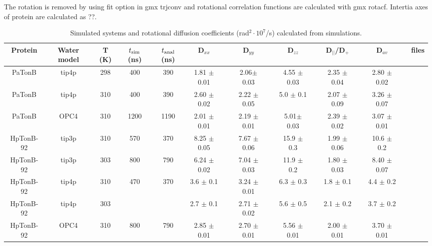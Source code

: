 \documentclass[pre,aps,floatfix,authordate1-4,twocolumn]{revtex4-1}
\begin{document}
The rotation is removed by using fit option in gmx trjconv and rotational
correlation functions are calculated with gmx rotacf. Intertia axes of protein
are calculated as ??.

\begin{table}[htb]
\centering
\caption{Simulated systems and rotational diffusion coefficients (rad$^2\cdot 10^7$/s) calculated from simulations.
}\label{ROTdiffCOEFFS}
\begin{tabular}{c c c c c c c c c c c c c c c c}
Protein     & Water model & T (K)  &  $t_{\rm sim}$ (ns)   &  $t_{\rm anal}$ (ns)   & D$_{xx}$ &&D$_{yy}$ &&D$_{zz}$ &&D$_{||}$/D$_+$ & &D$_{av}$& &files \\
\hline
PaTonB      & tip4p       & 298    & 400                 &  390                 & 1.81 $\pm$ 0.01 && 2.06$\pm$ 0.03 && 4.55 $\pm$ 0.03 && 2.35 $\pm$ 0.04 && 2.80 $\pm$ 0.02 && \cite{??} \\
PaTonB      & tip4p       & 310    & 400                 &  390                 &  2.60 $\pm$ 0.02 &&  2.22 $\pm$ 0.05& &  5.0  $\pm$ 0.1  & &  2.07 $\pm$ 0.09& &   3.26 $\pm$  0.07 && \cite{??}\\
PaTonB      & OPC4        & 310    & 1200                &  1190                &  2.01 $\pm$ 0.01 && 2.19 $\pm$ 0.01 && 5.01$\pm$ 0.03 && 2.39 $\pm$ 0.02 && 3.07 $\pm$ 0.01 && \cite{??}  \\
HpTonB-92   & tip3p       & 310    & 570           	 &  370                 & 8.25 $\pm$ 0.05 && 7.67 $\pm$ 0.06 && 15.9 $\pm$ 0.3 && 1.99 $\pm$ 0.06 &&  10.6 $\pm$ 0.2 &&  \cite{??} \\
HpTonB-92   & tip3p       & 303    & 800           	 &  790                 & 6.24 $\pm$ 0.02 && 7.04 $\pm$ 0.03 && 11.9 $\pm$ 0.2 && 1.80 $\pm$ 0.03 && 8.40 $\pm$ 0.07 && \cite{??} \\
HpTonB-92   & tip4p       & 310    & 470           	 &  370                 & 3.6 $\pm$ 0.1 && 3.24 $\pm$ 0.01 && 6.3 $\pm$ 0.3 && 1.8 $\pm$ 0.1 && 4.4 $\pm$ 0.2 && \cite{??} \\
HpTonB-92   & tip4p       & 303    &            	 &                      & 2.7 $\pm$ 0.1 && 2.71 $\pm$ 0.02 && 5.6 $\pm$ 0.5 && 2.1 $\pm$ 0.2 && 3.7 $\pm$ 0.2 && \cite{??} \\
HpTonB-92   & OPC4        & 310    & 800           	 &  790                 & 2.85 $\pm$ 0.01 && 2.70 $\pm$ 0.01 && 5.56 $\pm$ 0.01 && 2.00 $\pm$ 0.01 && 3.70 $\pm$ 0.01 && \cite{??} \\
\end{tabular}
\end{table}
\end{document}
